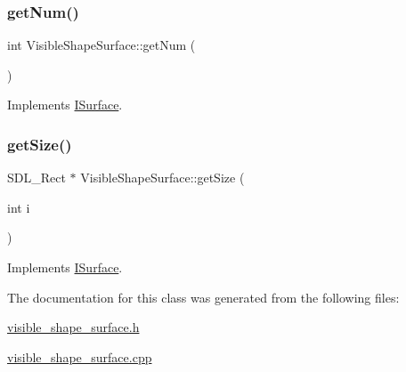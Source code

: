 \subsubsection{\texorpdfstring{get\+Num()}{getNum()}}
{\footnotesize\ttfamily int Visible\+Shape\+Surface\+::get\+Num (\begin{DoxyParamCaption}{ }\end{DoxyParamCaption})\hspace{0.3cm}{\ttfamily [virtual]}}



Implements \mbox{\hyperlink{class_i_surface_a1553f92deac310771e6fe63d62fc1d95}{I\+Surface}}.

\mbox{\label{class_visible_shape_surface_abc5e37a573511089f2cc42169fb89812}} 
\subsubsection{\texorpdfstring{get\+Size()}{getSize()}}
{\footnotesize\ttfamily S\+D\+L\+\_\+\+Rect $\ast$ Visible\+Shape\+Surface\+::get\+Size (\begin{DoxyParamCaption}\item[{int}]{i }\end{DoxyParamCaption})\hspace{0.3cm}{\ttfamily [virtual]}}



Implements \mbox{\hyperlink{class_i_surface_ae0b5040cd0eaa1897f61f994f7b2eacf}{I\+Surface}}.



The documentation for this class was generated from the following files\+:\begin{DoxyCompactItemize}
\item 
\mbox{\hyperlink{visible__shape__surface_8h}{visible\+\_\+shape\+\_\+surface.\+h}}\item 
\mbox{\hyperlink{visible__shape__surface_8cpp}{visible\+\_\+shape\+\_\+surface.\+cpp}}\end{DoxyCompactItemize}
